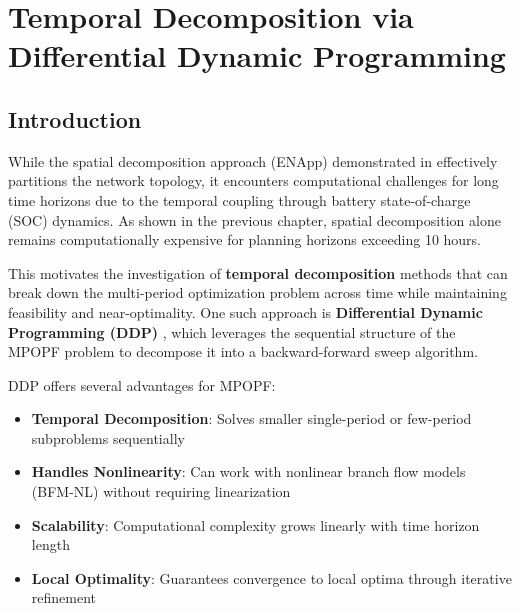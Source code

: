 \clearpage
\section{Temporal Decomposition via Differential Dynamic Programming}
\label{sec:ddp}

\subsection{Introduction}

While the spatial decomposition approach (ENApp) demonstrated in  effectively partitions the network topology, it encounters computational challenges for long time horizons due to the temporal coupling through battery state-of-charge (SOC) dynamics. As shown in the previous chapter, spatial decomposition alone remains computationally expensive for planning horizons exceeding 10 hours.

This motivates the investigation of \textbf{temporal decomposition} methods that can break down the multi-period optimization problem across time while maintaining feasibility and near-optimality. One such approach is \textbf{Differential Dynamic Programming (DDP)} \cite{ddp_sugar_01}, which leverages the sequential structure of the MPOPF problem to decompose it into a backward-forward sweep algorithm.

DDP offers several advantages for MPOPF:
\begin{itemize}
    \item \textbf{Temporal Decomposition}: Solves smaller single-period or few-period subproblems sequentially
    \item \textbf{Handles Nonlinearity}: Can work with nonlinear branch flow models (BFM-NL) without requiring linearization
    \item \textbf{Scalability}: Computational complexity grows linearly with time horizon length
    \item \textbf{Local Optimality}: Guarantees convergence to local optima through iterative refinement
\end{itemize}

